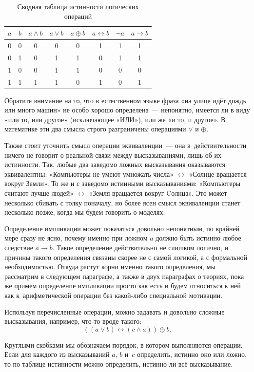 \begin{table}[h]
\centering
\begin{tabular}{cc|cccccc}
$a$ & $b$ & $a\land b$ & $a\lor b$ & $a\oplus b$ & $a\leftrightarrow b$ & $\neg a$ & $a \to b$\\
\hline
0 & 0 & 0 & 0 & 0 & 1 & 1 & 1 \\
0 & 1 & 0 & 1 & 1 & 0 & 1 & 1 \\
1 & 0 & 0 & 1 & 1 & 0 & 0 & 0 \\
1 & 1 & 1 & 1 & 0 & 1 & 0 & 1
\end{tabular}
\caption{Сводная таблица истинности логических операций}
\end{table}

Обратите внимание на то, что в естественном языке фраза «на улице идёт дождь или много машин» не особо хорошо определена~— непонятно, имеется ли в виду «или то, или другое» (исключающее «ИЛИ»), или же «и то, и другое». В математике эти два смысла строго разграничены операциями $\lor$ и $\oplus$.

Также стоит уточнить смысл операции эквиваленции~— она в~действительности ничего не говорит о реальной связи между высказываниями, лишь об их истинности. Так, любые два заведомо ложных высказывания оказываются эквивалентны: «Компьютеры не умеют умножать числа» $\leftrightarrow$ «Солнце вращается вок\-руг Земли». То же и с заведомо истинными высказываниями: «Компьютеры считают лучше людей» $\leftrightarrow$ «Земля вращается вок\-руг Cолнца». Это может несколько сбивать с толку поначалу, но более ясен смысл эквиваленции станет несколько позже, когда мы будем говорить о моделях.

Определение импликации может показаться довольно непонятным, по крайней мере сразу не ясно, почему именно при ложном $a$ должно быть истинно любое следствие $a\to b$. Такое определение действительно не слишком логично, и причины такого определения связаны скорее не с самой логикой, а с формальной необходимостью. Откуда растут корни именно такого \mbox{определения,} мы рассматрим в следующем параграфе, а также в двух параграфах о теориях, пока же примем определение импликации просто как есть и будем относиться к ней как к~арифметической операции без какой-либо специальной мотивации.

Используя перечисленные операции, можно задавать и довольно сложные высказывания, например, что-то вроде такого:
$$
((a \lor b) \leftrightarrow (c \land a)) \oplus b.
$$

Круглыми скобками мы обозначаем порядок, в котором выполняются операции. Если для каждого из высказываний $a$, $b$ и~$c$ определить, истинно оно или ложно, то по таблице истинности можно определить, истинно ли всё высказывание.

